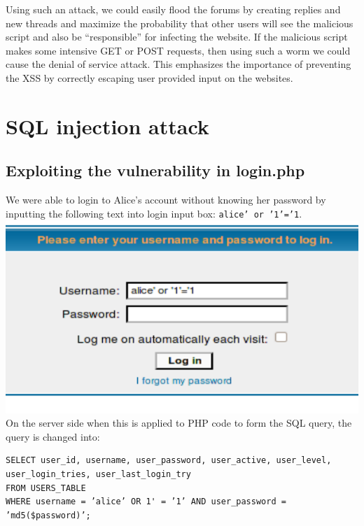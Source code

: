 \documentclass[12pt, a4paper, pdflatex]{article}
\begin{document}
Using such an attack, we could easily flood the forums by creating replies and new threads and maximize the probability that other users will see the malicious script and also be ``responsible'' for infecting the website. If the malicious script makes some intensive GET or POST requests, then using such a worm we could cause the denial of service attack. This emphasizes the importance of preventing the XSS by correctly escaping user provided input on the websites.

\section{SQL injection attack}

\subsection{Exploiting the vulnerability in login.php\label{sec:sql:login}}

We were able to login to Alice's account without knowing her password by inputting the following
text into login input box: \texttt{alice' or '1'='1}.\\

\includegraphics[width=.95\textwidth]{gfx/sql/login.png}\\

On the server side when this is applied to PHP code to form the SQL query, the query is changed into:

\lstset{
  captionpos=b,
  frame=single,
  language=SQL,
  breaklines=true,
  label=sql1
}
\begin{lstlisting}
SELECT user_id, username, user_password, user_active, user_level,
user_login_tries, user_last_login_try
FROM USERS_TABLE
WHERE username = ’alice’ OR 1' = ’1’ AND user_password = ’md5($password)’;
\end{lstlisting}
\end{document}
